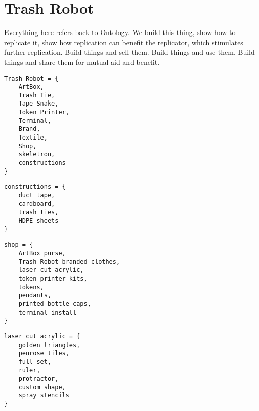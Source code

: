 \section{Trash Robot}

Everything here refers back to Ontology.  We build this thing, show how to replicate it, show how replication can benefit the replicator, which stimulates further replication.  Build things and sell them. Build things and use them. Build things and share them for mutual aid and benefit. 

\begin{verbatim}
Trash Robot = {
    ArtBox,
    Trash Tie,
    Tape Snake,
    Token Printer,
    Terminal,
    Brand,
    Textile,
    Shop,
    skeletron,
    constructions
}
\end{verbatim}
    
\begin{verbatim}
constructions = {
    duct tape, 
    cardboard, 
    trash ties, 
    HDPE sheets
}
\end{verbatim}
\begin{verbatim}
shop = {
    ArtBox purse, 
    Trash Robot branded clothes, 
    laser cut acrylic, 
    token printer kits,
    tokens,
    pendants,
    printed bottle caps,
    terminal install
}
\end{verbatim}

\begin{verbatim}
laser cut acrylic = {
    golden triangles, 
    penrose tiles, 
    full set, 
    ruler,
    protractor,
    custom shape,
    spray stencils
}
\end{verbatim}